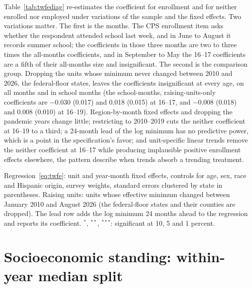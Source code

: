 \documentclass[12pt]{article}
\begin{document}
Table~\ref{tab:twfediag} re-estimates the coefficient for enrollment and for neither enrolled nor employed under variations of the sample and the fixed effects. Two variations matter. The first is the months. The CPS enrollment item asks whether the respondent attended school last week, and in June to August it records summer school; the coefficients in those three months are two to three times the all-months coefficients, and in September to May the 16--17 coefficients are a fifth of their all-months size and insignificant. The second is the comparison group. Dropping the units whose minimum never changed between 2010 and 2026, the federal-floor states, leaves the coefficients insignificant at every age, on all months and in school months (the school-months, raising-units-only coefficients are $-0.030$ (0.017) and 0.018 (0.015) at 16--17, and $-0.008$ (0.018) and 0.008 (0.010) at 16--19). Region-by-month fixed effects and dropping the pandemic years change little; restricting to 2010--2019 cuts the neither coefficient at 16--19 to a third; a 24-month lead of the log minimum has no predictive power, which is a point in the specification's favor; and unit-specific linear trends remove the neither coefficient at 16--17 while producing implausible positive enrollment effects elsewhere, the pattern \citet{meer2016} describe when trends absorb a trending treatment.

\begin{table}[H]
\centering
\caption{Two-way fixed effects coefficient on the log minimum wage under variations of sample and fixed effects}
\label{tab:twfediag}
\small

\begin{tablenotes}\footnotesize
\item Regression~\eqref{eq:twfe}: unit and year-month fixed effects, controls for age, sex, race and Hispanic origin, survey weights, standard errors clustered by state in parentheses. Raising units: units whose effective minimum changed between January 2010 and August 2026 (the federal-floor states and their counties are dropped). The lead row adds the log minimum 24 months ahead to the regression and reports its coefficient. $^{*}$, $^{**}$, $^{***}$: significant at 10, 5 and 1 percent.
\end{tablenotes}
\end{table}

\section{Socioeconomic standing: within-year median split}\label{app:sesrel}
\end{document}
